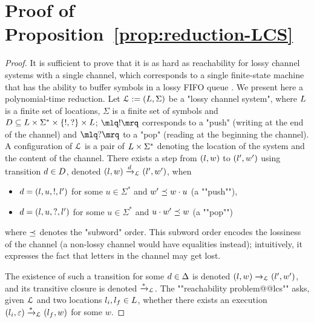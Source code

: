 \section{Proof of Proposition~\ref{prop:reduction-LCS}}
\label{app:reduction-lcs}

\propReductionLCS*

\begin{proof}
	It is sufficient to prove that it is as hard as reachability for lossy channel systems with a single channel, which corresponds to a single finite-state machine that has the ability to buffer symbols in a lossy FIFO queue \cite{Schnoebelen2002verifying}. We present here a polynomial-time reduction.
	Let $\mathcal{L} := (L,\Sigma)$ be a "lossy channel system", where $L$ is a finite set of locations, $\Sigma$ is a finite set of symbols and $D \subseteq L \times \Sigma^* \times \{!, ?\} \times L$; $\quotemarks{!}$ corresponds to a "push" (writing at the end of the channel) and $\quotemarks{?}$ to a "pop" (reading at the beginning the channel). A configuration of $\mathcal{L}$ is a pair of $L \times \Sigma^*$ denoting the location of the system and the content of the channel. There exists a step from $(l,w)$ to $(l',w')$ using transition $d \in D$, denoted $(l,w) \xrightarrow{d}_{\mathcal{L}} (l',w')$, when
	\begin{itemize}
		\item $d = (l,u,!,l')$ for some $u \in \Sigma^*$ and $w' \preceq w \cdot u$ (a ""push""),
		\item $d = (l,u,?,l')$ for some $u \in \Sigma^*$ and $u \cdot w' \preceq w$ (a ""pop"")
	\end{itemize}
	where $\preceq$ denotes the "subword" order.
	This subword order encodes the lossiness of the channel (a non-lossy channel would have equalities instead); intuitively, it expresses the fact that letters in the channel may get lost. 
	
	The existence of such a transition for some $d \in \Delta$ is denoted $(l,w) \xrightarrow{}_{\mathcal{L}} (l',w')$, and its transitive closure is denoted $\xrightarrow{*}_{\mathcal{L}}$. The ""reachability problem@@lcs"" asks, given $\mathcal{L}$ and two locations $l_i, l_f \in L$, whether there exists an execution $(l_i,\varepsilon) \xrightarrow{*}_{\mathcal{L}} (l_f, w)$ for some $w$. 
	

\end{proof}

